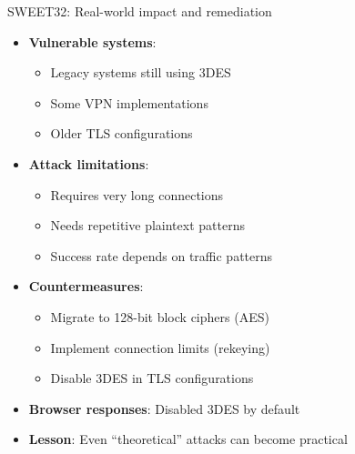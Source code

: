 \documentclass[aspectratio=169, lualatex, handout]{beamer}
\begin{document}
\begin{frame}{SWEET32: Real-world impact and remediation}
	\begin{itemize}[<+->]
		\item \textbf{Vulnerable systems}:
		      \begin{itemize}
			      \item Legacy systems still using 3DES
			      \item Some VPN implementations
			      \item Older TLS configurations
		      \end{itemize}
		\item \textbf{Attack limitations}:
		      \begin{itemize}
			      \item Requires very long connections
			      \item Needs repetitive plaintext patterns
			      \item Success rate depends on traffic patterns
		      \end{itemize}
		\item \textbf{Countermeasures}:
		      \begin{itemize}
			      \item Migrate to 128-bit block ciphers (AES)
			      \item Implement connection limits (rekeying)
			      \item Disable 3DES in TLS configurations
		      \end{itemize}
		\item \textbf{Browser responses}: Disabled 3DES by default
		\item \textbf{Lesson}: Even ``theoretical'' attacks can become practical
	\end{itemize}
\end{frame}
\end{document}
